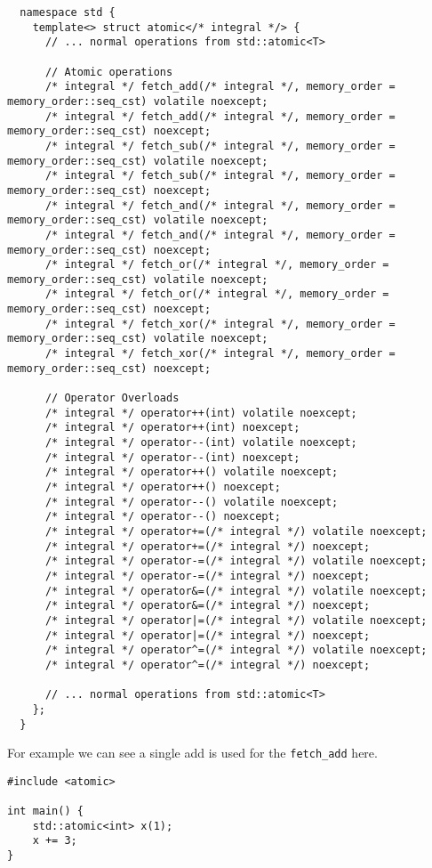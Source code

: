 \begin{verbatim}
  namespace std {
    template<> struct atomic</* integral */> {
      // ... normal operations from std::atomic<T>

      // Atomic operations
      /* integral */ fetch_add(/* integral */, memory_order = memory_order::seq_cst) volatile noexcept;
      /* integral */ fetch_add(/* integral */, memory_order = memory_order::seq_cst) noexcept;
      /* integral */ fetch_sub(/* integral */, memory_order = memory_order::seq_cst) volatile noexcept;
      /* integral */ fetch_sub(/* integral */, memory_order = memory_order::seq_cst) noexcept;
      /* integral */ fetch_and(/* integral */, memory_order = memory_order::seq_cst) volatile noexcept;
      /* integral */ fetch_and(/* integral */, memory_order = memory_order::seq_cst) noexcept;
      /* integral */ fetch_or(/* integral */, memory_order = memory_order::seq_cst) volatile noexcept;
      /* integral */ fetch_or(/* integral */, memory_order = memory_order::seq_cst) noexcept;
      /* integral */ fetch_xor(/* integral */, memory_order = memory_order::seq_cst) volatile noexcept;
      /* integral */ fetch_xor(/* integral */, memory_order = memory_order::seq_cst) noexcept;

      // Operator Overloads
      /* integral */ operator++(int) volatile noexcept;
      /* integral */ operator++(int) noexcept;
      /* integral */ operator--(int) volatile noexcept;
      /* integral */ operator--(int) noexcept;
      /* integral */ operator++() volatile noexcept;
      /* integral */ operator++() noexcept;
      /* integral */ operator--() volatile noexcept;
      /* integral */ operator--() noexcept;
      /* integral */ operator+=(/* integral */) volatile noexcept;
      /* integral */ operator+=(/* integral */) noexcept;
      /* integral */ operator-=(/* integral */) volatile noexcept;
      /* integral */ operator-=(/* integral */) noexcept;
      /* integral */ operator&=(/* integral */) volatile noexcept;
      /* integral */ operator&=(/* integral */) noexcept;
      /* integral */ operator|=(/* integral */) volatile noexcept;
      /* integral */ operator|=(/* integral */) noexcept;
      /* integral */ operator^=(/* integral */) volatile noexcept;
      /* integral */ operator^=(/* integral */) noexcept;

      // ... normal operations from std::atomic<T>
    };
  }
\end{verbatim}
For example we can see a single add is used for the \texttt{fetch_add} here.
\\ \begin{minipage}{.49\textwidth}
  \begin{verbatim}
#include <atomic>

int main() {
    std::atomic<int> x(1);
    x += 3;
}
  \end{verbatim}
\end{minipage}
